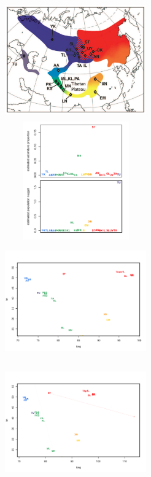 \documentclass[12pt]{article}
\begin{document}
\begin{figure}
	\centering
			{\includegraphics[width=2.4in,height=2in]{figs/Irwin_warbler_map_figure.png}}
			{\includegraphics[width=2.4in,height=2in]{figs/population_warbler_admix_values_nugget.png}}
			{\includegraphics[width=2.4in,height=2in]{figs/population_warbler_map_no_arrows.png}}
			{\includegraphics[width=2.4in,height=2in]{figs/population_warbler_map_randpr1.png}}

\end{figure}
\end{document}
